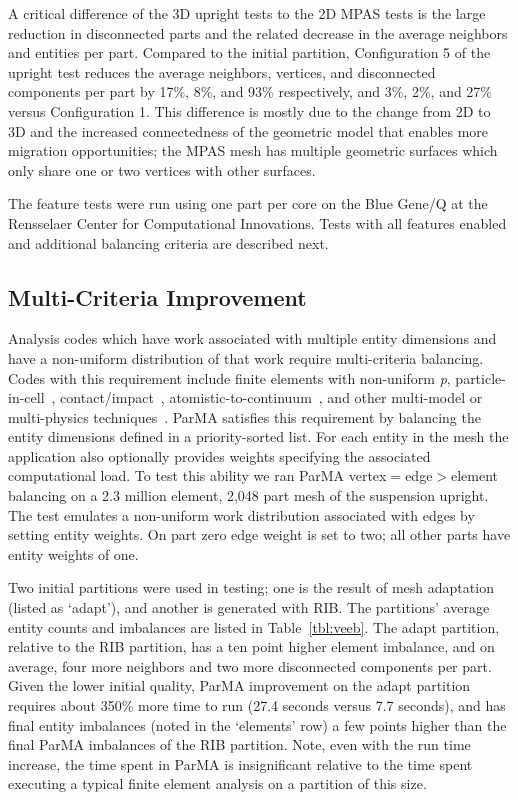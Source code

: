 A critical difference of the 3D upright tests to the 2D MPAS tests is the large
reduction in disconnected parts and the related decrease in the average
neighbors and entities per part.
Compared to the initial partition, Configuration 5 of the upright test reduces
the average neighbors, vertices, and disconnected components per part by 17\%,
8\%, and 93\% respectively, and 3\%, 2\%, and 27\% versus Configuration 1.
This difference is mostly due to the change from 2D to 3D and the increased
connectedness of the geometric model that enables more migration opportunities;
the MPAS mesh has multiple geometric surfaces which only share one or two
vertices with other surfaces.

The feature tests were run using one part per core on the Blue Gene/Q at the
Rensselaer Center for Computational Innovations.
Tests with all features enabled and additional balancing criteria are described next.

\subsection{Multi-Criteria Improvement}

Analysis codes which have work associated with multiple entity dimensions and have a
non-uniform distribution of that work require multi-criteria balancing.
Codes with this requirement include finite elements with
non-uniform \textit{p}, particle-in-cell~\cite{worleyBalancePic2016},
contact/impact~\cite{fingbergContact2000},
atomistic-to-continuum~\cite{FrantzDale2010}, and other multi-model or
multi-physics techniques~\cite{chevalier2012load}.
ParMA satisfies this requirement by balancing the entity dimensions defined in
a priority-sorted list.
For each entity in the mesh the application also optionally provides weights
specifying the associated computational load.
To test this ability we ran ParMA vertex$=$edge$>$element balancing on a 2.3 million
element, 2,048 part mesh of the suspension upright.
The test emulates a non-uniform work distribution associated with edges by
setting entity weights.
On part zero edge weight is set to two; all other parts have entity weights of
one.

Two initial partitions were used in testing; one is the result of mesh adaptation
(listed as `adapt'), and another is generated with RIB.
The partitions' average entity counts and imbalances are listed in
Table~\ref{tbl:veeb}.
The adapt partition, relative to the RIB partition, has a ten point higher
element imbalance, and on average, four more neighbors and two more disconnected
components per part.
Given the lower initial quality, ParMA improvement on the adapt partition
requires about 350\% more time to run (27.4 seconds versus 7.7 seconds), and has 
final entity imbalances (noted in the `elements' row) a few points
higher than the final ParMA imbalances of the RIB partition.
Note, even with the run time increase, the time spent in ParMA is insignificant
relative to the time spent executing a typical finite element analysis
on a partition of this size.

